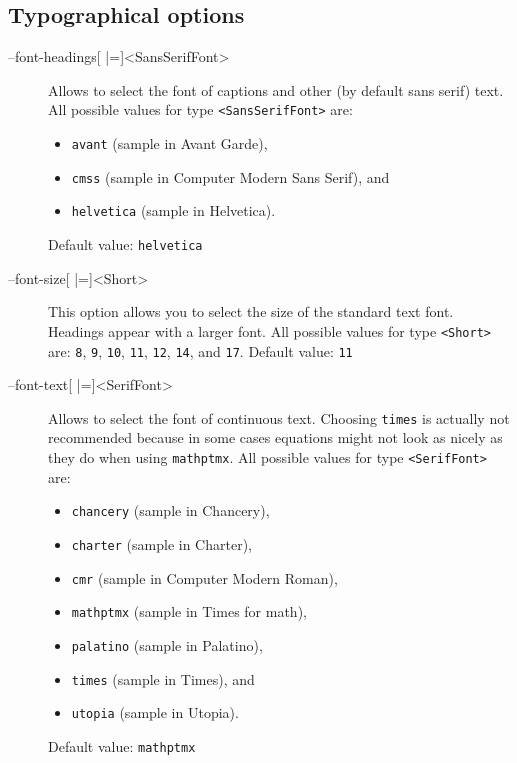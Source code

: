 \subsection{Typographical options}
\begin{description}
\item[--font-headings{[} |={]}<SansSerifFont>]
  Allows to select the font of captions and other (by default sans
  serif) text.
  All possible values for type \texttt{<SansSerifFont>} are:
  \begin{itemize}
  \item \texttt{avant} {\selectfont (sample in Avant Garde)},
  \item \texttt{cmss} {\selectfont (sample in Computer Modern Sans Serif)}, and
  \item \texttt{helvetica} {\selectfont (sample in Helvetica)}.
  \end{itemize}
  Default value: \texttt{helvetica}

\item[--font-size{[} |={]}<Short>]
  This option allows you to select the size of the standard text
  font. Headings appear with a larger font.
  All possible values for type \texttt{<Short>} are:
  \texttt{8}, \texttt{9}, \texttt{10}, \texttt{11}, \texttt{12}, \texttt{14},
  and \texttt{17}.
  Default value: \texttt{11}

\item[--font-text{[} |={]}<SerifFont>]
  Allows to select the font of continuous text. Choosing \texttt{times}
  is actually not recommended because in some cases equations
  might not look as nicely as they do when using \texttt{mathptmx}.
  All possible values for type \texttt{<SerifFont>} are:
  \begin{itemize}
  \item \texttt{chancery} {\selectfont (sample in Chancery)},
  \item \texttt{charter}  {\selectfont (sample in Charter)},
  \item \texttt{cmr}  {\selectfont (sample in Computer Modern Roman)},
  \item \texttt{mathptmx}  {\selectfont (sample in Times for math)},
  \item \texttt{palatino}  {\selectfont (sample in Palatino)},
  \item \texttt{times}  {\selectfont (sample in Times)}, and
  \item \texttt{utopia}  {\selectfont (sample in Utopia)}.
  \end{itemize}
  Default value: \texttt{mathptmx}


\end{description}
